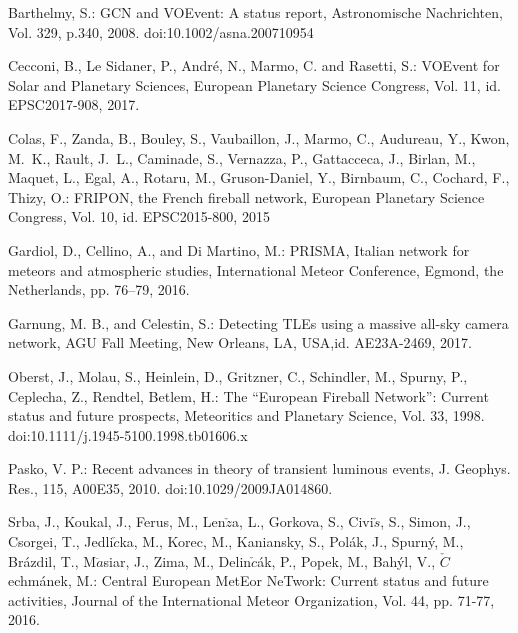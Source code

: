 \documentclass[10pt,twocolumn]{article}
\begin{document}
\begin{thebibliography}{}

\small

Barthelmy, S.: GCN and VOEvent: A status report, Astronomische Nachrichten, Vol. 329, p.340, 2008.
doi:10.1002/asna.200710954

Cecconi, B., Le Sidaner, P., Andr\'e, N., Marmo, C. and Rasetti, S.: VOEvent for Solar and Planetary Sciences, European Planetary Science Congress, Vol. 11, id. EPSC2017-908, 2017.

Colas, F., Zanda, B., Bouley, S., Vaubaillon, J., Marmo, C., Audureau, Y., Kwon, M.~K., Rault, J.~L., Caminade, S., Vernazza, P., Gattacceca, J., Birlan, M., Maquet, L., Egal, A., Rotaru, M., Gruson-Daniel, Y., Birnbaum, C., Cochard, F., Thizy, O.: FRIPON, the French fireball network, European Planetary Science Congress, Vol. 10, id. EPSC2015-800, 2015


Gardiol, D., Cellino, A., and Di Martino, M.: PRISMA, Italian network for meteors and atmospheric studies, International Meteor Conference, Egmond, the  Netherlands, pp. 76–79, 2016.

Garnung, M. B., and Celestin, S.: Detecting TLEs using a massive all-sky camera network, AGU Fall Meeting, New Orleans, LA, USA,id. AE23A-2469, 2017.

Oberst, J., Molau, S., Heinlein, D., Gritzner, C., Schindler, M., Spurny, P., Ceplecha, Z., Rendtel, Betlem, H.: The ``European Fireball Network'': Current status and future prospects, Meteoritics and Planetary Science, Vol. 33, 1998. doi:10.1111/j.1945-5100.1998.tb01606.x

Pasko, V. P.: Recent advances in theory of transient luminous events, J. Geophys. Res., 115, A00E35, 2010. doi:10.1029/2009JA014860.

Srba, J., Koukal, J., Ferus, M., Len$\check{z}$a, L., Gorkova, S., Civi$\check{s}$, S., Simon, J., Csorgei, T., Jedli$\check{c}$ka, M., Korec, M., Kaniansky, S., Pol\'ak, J., Spurn\'y, M., Br\'azdil, T., M$\ddot{a}$siar, J., Zima, M., Delin$\check{c}$\'ak, P., Popek, M., Bah\'yl, V., $\check{C}$echm\'anek, M.: Central European MetEor NeTwork: Current status and future activities, Journal of the International Meteor Organization, Vol. 44, pp. 71-77, 2016.

\end{thebibliography}
\end{document}
